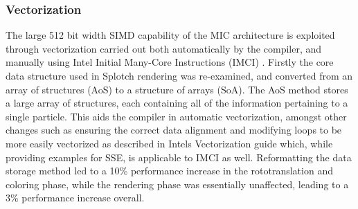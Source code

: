 \documentclass[runningheads,a4paper]{llncs}
\begin{document}



\subsubsection{Vectorization}
\label{sect:vectorization}

The large 512 bit width SIMD capability of the MIC architecture is exploited through vectorization carried out both 
automatically by the compiler, and manually using Intel Initial Many-Core Instructions (IMCI) \cite{imci}. Firstly the 
core data structure used in Splotch rendering was re-examined, and converted from an array of structures (AoS) to 
a structure of arrays (SoA). The AoS method stores a large array of structures, each containing all of the 
information pertaining to a single particle. This aids the compiler in automatic vectorization, 
amongst other changes such as ensuring the correct data alignment and modifying loops to be more easily vectorized 
as described in Intels Vectorization guide \cite{vectorguide} which, while providing examples for SSE, is applicable 
to IMCI as well. Reformatting the data storage method led to a 10\% performance increase in the rototranslation and 
coloring phase, while the rendering phase was essentially unaffected, leading to a 3\% performance increase overall.
\end{document}
